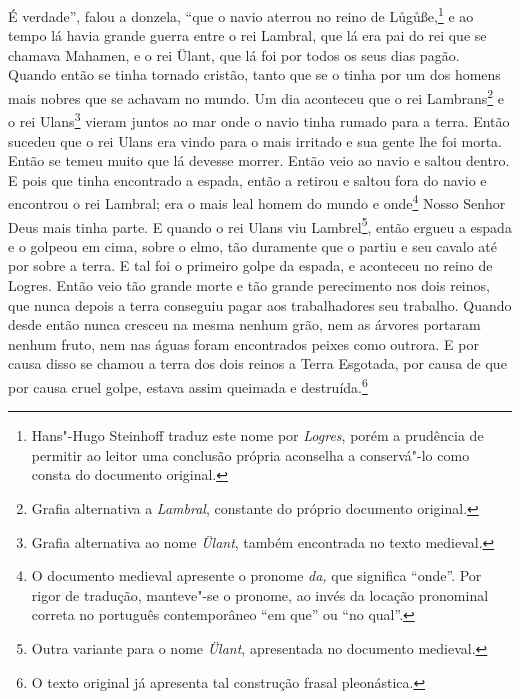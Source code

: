  É verdade”, falou a donzela, “que o navio aterrou no reino de
Lůgůße,\footnote{Hans"-Hugo Steinhoff traduz este nome por \textit{Logres}, porém
a prudência de permitir ao leitor uma conclusão própria aconselha a conservá"-lo
como consta do documento original.}  e ao tempo lá havia grande
guerra entre o rei Lambral, que lá era pai do rei que se chamava Mahamen, e o
rei Ülant, que lá foi por todos os seus dias pagão. Quando então se tinha
tornado cristão, tanto que se o tinha por um dos homens mais nobres que se
achavam no mundo. Um dia aconteceu que o rei Lambrans\footnote{ Grafia
alternativa a \textit{Lambral}, constante do próprio documento original.
 } e o rei Ulans\footnote{ Grafia alternativa ao nome \textit{Ülant},
também encontrada no texto medieval.}  vieram juntos ao mar onde o
navio tinha rumado para a terra. Então sucedeu que o rei Ulans era vindo para o
mais irritado e sua gente lhe foi morta. Então se temeu muito que lá devesse
morrer. Então veio ao navio e saltou dentro. E pois que tinha encontrado a
espada, então a retirou e saltou fora do navio e encontrou o rei Lambral; era o
mais leal homem do mundo e onde\footnote{ O documento medieval apresente o
pronome \textit{da, }que significa “onde”. Por rigor de tradução, manteve"-se o
pronome, ao invés da locação pronominal correta no português contemporâneo “em
que” ou “no qual”.}  Nosso Senhor Deus mais tinha parte. E quando o
rei Ulans viu Lambrel\footnote{ Outra variante para o nome \textit{Ülant},
apresentada no documento medieval.},  então ergueu a espada e o
golpeou em cima, sobre o elmo, tão duramente que o partiu e seu cavalo até por
sobre a terra. E tal foi o primeiro golpe da espada, e aconteceu no reino de
Logres. Então veio tão grande morte e tão grande perecimento nos dois reinos,
que nunca depois a terra conseguiu pagar aos trabalhadores seu trabalho. Quando
desde então nunca cresceu na mesma nenhum grão, nem as árvores portaram nenhum
fruto, nem nas águas foram encontrados peixes como outrora. E por causa disso
se chamou a terra dos dois reinos a Terra Esgotada, por causa de que por causa
cruel golpe, estava assim queimada e destruída.\footnote{ O texto original já
apresenta tal construção frasal pleonástica.}  

